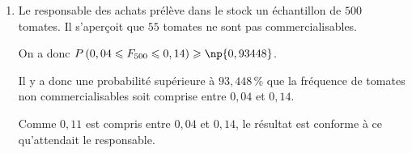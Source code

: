 \begin{enumerate}
\begin{enumerate}
$P\left (0,04 < F_n < 0,14\right ) =  1-P \left (\left | F_n-0,09 \right | \geqslant 0,05\right )$	

$P\left ( \left |F_n-0,09\strut \right | \geqslant 0,05 \right ) \leqslant \dfrac{32,76}{n}$
donc
$-P\left ( \left |F_n-0,09\strut \right | \geqslant 0,05 \right ) \geqslant -\dfrac{32,76}{n}$

donc
$1-P\left ( \left |F_n-0,09\strut \right | \geqslant 0,05 \right ) \geqslant 1 -\dfrac{32,76}{n}$
et donc
$P\left (0,04 < F_n < 0,14\right ) \geqslant 1 -\dfrac{32,76}{n}$

		\item Le responsable des achats prélève dans le stock un échantillon de $500$ tomates. Il s'aperçoit que $55$ tomates ne sont pas commercialisables.



On a donc $P\left (0,04 \leqslant F_{500} \leqslant 0,14\right ) \geqslant \np{0,93448}$.

Il y a donc une probabilité supérieure à $93,448$\,\% que la fréquence de tomates non commercialisables soit comprise entre $0,04$ et $0,14$.

Comme $0,11$ est compris  entre $0,04$ et $0,14$, le résultat est conforme à ce qu'attendait le responsable.

	\end{enumerate}
\end{enumerate}

\medskip
